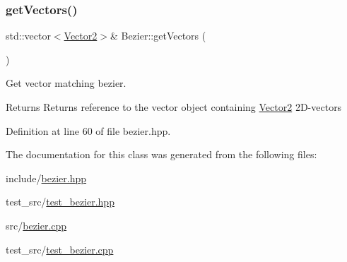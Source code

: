 \subsubsection{\texorpdfstring{get\+Vectors()}{getVectors()}\hspace{0.1cm}{\footnotesize\ttfamily [2/2]}}
{\footnotesize\ttfamily std\+::vector$<$\mbox{\hyperlink{classVector2}{Vector2}}$>$\& Bezier\+::get\+Vectors (\begin{DoxyParamCaption}{ }\end{DoxyParamCaption})\hspace{0.3cm}{\ttfamily [inline]}}



Get vector matching bezier. 

\begin{DoxyReturn}{Returns}
Returns reference to the vector object containing \mbox{\hyperlink{classVector2}{Vector2}} 2\+D-\/vectors 
\end{DoxyReturn}


Definition at line 60 of file bezier.\+hpp.



The documentation for this class was generated from the following files\+:\begin{DoxyCompactItemize}
\item 
include/\mbox{\hyperlink{bezier_8hpp}{bezier.\+hpp}}\item 
test\+\_\+src/\mbox{\hyperlink{test__bezier_8hpp}{test\+\_\+bezier.\+hpp}}\item 
src/\mbox{\hyperlink{bezier_8cpp}{bezier.\+cpp}}\item 
test\+\_\+src/\mbox{\hyperlink{test__bezier_8cpp}{test\+\_\+bezier.\+cpp}}\end{DoxyCompactItemize}
